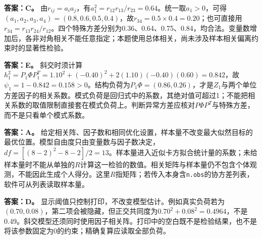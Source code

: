 \textbf{答案：C。} 由$r_{ij}=a_i a_j$，有$a_1^2=r_{12}r_{13}/r_{23}=0.64$。统一取$a_1>0$，可得$(a_1,a_2,a_3,a_4)=(0.8,0.6,0.5,0.4)$，故$r_{34}=0.5\times0.4=0.20$；也可直接用$r_{34}=r_{13}r_{24}/r_{12}$。四个特殊方差分别为0.36、0.64、0.75、0.84，均合法。变量数增加后，各非对角相关不能任意指定；本题使用总体相关，尚未涉及样本相关偏离约束时的显著性检验。
\par\nobreak\smallskip{}

\textbf{答案：E。} 斜交时须计算$h_1^2=P_1\Phi P_1^T=1.10^2+(-0.40)^2+2(1.10)(-0.40)(0.60)=0.842$，故$\psi_1=1-0.842=0.158>0$。结构负荷为$P_1\Phi=(0.86,0.26)$，才是$Z_1$与两个单位方差因子的相关系数。模式负荷是回归式中的系数，其绝对值可超过1；不能把相关系数的取值限制直接套在模式负荷上。判断异常方差应核对$P\Phi P^T$与特殊方差，而不是只看单个模式系数。
\par\nobreak\smallskip{}

\textbf{答案：A。} 给定相关阵、因子数和相同优化设置，样本量不改变最大似然目标的最优位置。模型自由度只由变量数与因子数决定，$df=[(8-2)^2-8-2]/2=13$。样本量进入近似卡方拟合统计量的系数；未给样本量时不能从单独的$R$计算这一检验的数值。相关矩阵与样本量仍不包含个体观测，不能因此生成个人得分。这里$R$指矩阵；若传入本身含\texttt{n.obs}的协方差列表，软件可从列表读取样本量。
\par\nobreak\smallskip{}

\textbf{答案：D。} 显示阈值只控制打印，不改变模型估计。例如真实负荷若为$(0.70,0.08)$，第二项会被隐藏，但正交共同度为$0.70^2+0.08^2=0.4964$，不是0.49。斜交模型还须同时使用因子相关阵。打印中的空白既不是检验结果，也不是将该参数固定为0的约束；精确复算应读取全部负荷。
\par\nobreak\smallskip{}

